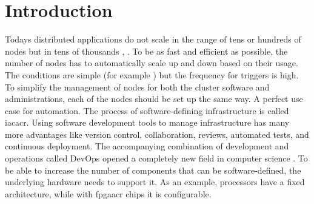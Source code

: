 \chapter{Introduction}




Todays distributed applications do not scale in the range of tens or hundreds of nodes but in tens of thousands \cite{distributed_systems_concepts}, \cite{cluster_computing_whitepaper} \cite{kubernetes_15000_nodes}. To be as fast and efficient as possible, the number of nodes has to automatically scale up and down based on their usage. The conditions are simple (for example ) but the frequency for triggers is high. To simplify the management of nodes for both the cluster software and administrations, each of the nodes should be set up the same way. A perfect use case for automation.
\newline
The process of software-defining infrastructure is called \gls{iacacr}. Using software development tools to manage infrastructure has many more advantages like version control, collaboration, reviews, automated tests, and continuous deployment. The accompanying combination of development and operations called DevOps opened a completely new field in computer science \cite{bachelor_thesis}. To be able to increase the number of components that can be software-defined, the underlying hardware needs to support it. As an example, processors have a fixed architecture, while with \gls{fpgaacr} chips it is configurable.


